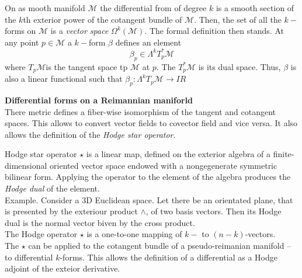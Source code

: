 \documentclass[11pt,a4paper,headinclude=true,DIV=14,BCOR=8mm,chapterprefix,listof=totoc,twoside,openright,abstracton]{scrbook}
\begin{document}
\begin{sidenote}
    On as mooth manifold $\mathcal{M}$ the differential from of degree $k$ is a smooth section of the $k$th exterior power of the cotangent bundle of $\mathcal{M}$. Then, the set of all the $k-$forms on $\mathcal{M}$ is a \textit{vector space} $\Omega^k(\mathcal{M})$. The formal definition then stands. At any point $p\in \mathcal{M}$ a $k-$form $\beta$ defines an element 
    \begin{equation}
        \beta_p\in\Lambda^kT^* _p \mathcal{M}
    \end{equation}
    where $T_p\mathcal{M}$is the tangent space tp $\mathcal{M}$ at $p$. The $T^* _p \mathcal{M}$ is its dual space. Thus, $\beta$ is also a linear functional such that $\beta_p:\Lambda^k T_p \mathcal{M}\rightarrow I\!R$
\end{sidenote}

\begin{sidenote}
    \textbf{Differential forms on a Reimannian maniforld} \\
    There metric defines a fiber-wise isomorphism of the tangent and cotangent spaces. This allows to convert vector fields to covector field and vice versa. It also allows the definition of the \textit{Hodge star operator}.
    
    Hodge star operator $\star$ is a linear map, defined on the exterior algebra of a finite-dimensional oriented vector space endowed with a nongegenerate symmetric bilinear form. Applying the operator to the element of the algebra produces the \textit{Hodge dual} of the element. \\ 
    
    Example. Consider a 3D Euclidean space. Let there be an orientated plane, that is presented by the exteriour product $\wedge$, of two basis vectors. Then its Hodge dual is the normal vector biven by the cross product. \\
    The Hodge operator $\star$ is a one-to-one mapping of $k-$ to $(n-k)$-vectors.\\
    
    The $\star$ can be applied to the cotangent bundle of a pseudo-reimanian manifold -- to differential $k$-forms. This allows the definition of a differential as a Hodge adjoint of the exteior derivative. 
    

\end{sidenote}
\end{document}
